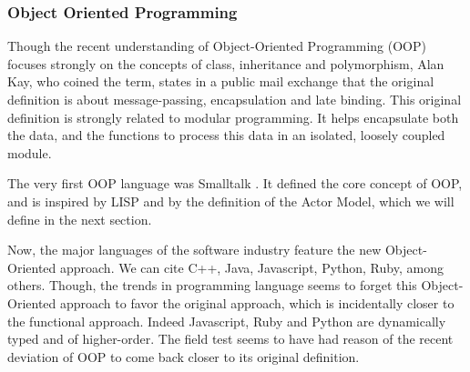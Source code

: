 \subsubsection{Object Oriented Programming}


Though the recent understanding of Object-Oriented Programming (OOP) focuses strongly on the concepts of class, inheritance and polymorphism, Alan Kay, who coined the term, states in a public mail exchange that the original definition is about message-passing, encapsulation and late binding.
This original definition is strongly related to modular programming.
It helps encapsulate both the data, and the functions to process this data in an isolated, loosely coupled module.

The very first OOP language was Smalltalk \cite{Goldberg1984}.
It defined the core concept of OOP, and is inspired by LISP and by the definition of the Actor Model, which we will define in the next section.


Now, the major languages of the software industry feature the new Object-Oriented approach.
We can cite C++, Java, Javascript, Python, Ruby, among others.
Though, the trends in programming language seems to forget this Object-Oriented approach to favor the original approach, which is incidentally closer to the functional approach.
Indeed Javascript, Ruby and Python are dynamically typed and of higher-order.
The field test seems to have had reason of the recent deviation of OOP to come back closer to its original definition.

